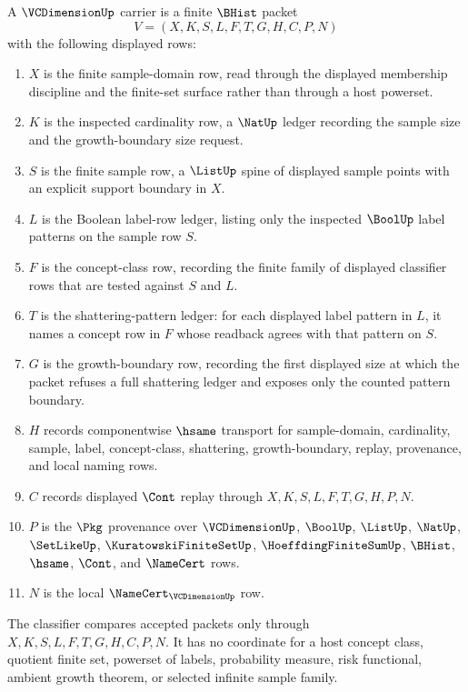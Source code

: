 \begin{definition}
\label{def:vc-dimension-carrier}
A $\VCDimensionUp$ carrier is a finite $\BHist$ packet
$$
V=(X,K,S,L,F,T,G,H,C,P,N)
$$
with the following displayed rows:
\begin{enumerate}
\item $X$ is the finite sample-domain row, read through the displayed
membership discipline and the finite-set surface rather than through a host
powerset.
\item $K$ is the inspected cardinality row, a $\NatUp$ ledger recording the
sample size and the growth-boundary size request.
\item $S$ is the finite sample row, a $\ListUp$ spine of displayed sample
points with an explicit support boundary in $X$.
\item $L$ is the Boolean label-row ledger, listing only the inspected
$\BoolUp$ label patterns on the sample row $S$.
\item $F$ is the concept-class row, recording the finite family of displayed
classifier rows that are tested against $S$ and $L$.
\item $T$ is the shattering-pattern ledger: for each displayed label pattern
in $L$, it names a concept row in $F$ whose readback agrees with that pattern
on $S$.
\item $G$ is the growth-boundary row, recording the first displayed size at
which the packet refuses a full shattering ledger and exposes only the counted
pattern boundary.
\item $H$ records componentwise $\hsame$ transport for sample-domain,
cardinality, sample, label, concept-class, shattering, growth-boundary,
replay, provenance, and local naming rows.
\item $C$ records displayed $\Cont$ replay through
$X,K,S,L,F,T,G,H,P,N$.
\item $P$ is the $\Pkg$ provenance over $\VCDimensionUp$, $\BoolUp$,
$\ListUp$, $\NatUp$, $\SetLikeUp$, $\KuratowskiFiniteSetUp$,
$\HoeffdingFiniteSumUp$, $\BHist$, $\hsame$, $\Cont$, and $\NameCert$ rows.
\item $N$ is the local $\NameCert_{\VCDimensionUp}$ row.
\end{enumerate}
The classifier compares accepted packets only through
$X,K,S,L,F,T,G,H,C,P,N$. It has no coordinate for a host concept class,
quotient finite set, powerset of labels, probability measure, risk functional,
ambient growth theorem, or selected infinite sample family.
\end{definition}

